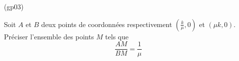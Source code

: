 \begin{tiny}(gp03)\end{tiny}
Soit $A$ et $B$ deux points de coordonnées respectivement
$(\frac{k}{\mu},0)$ et $(\mu k , 0)$. Préciser l'ensemble des points $M$ tels que
\[\frac{AM}{BM}=\frac{1}{\mu}\]
